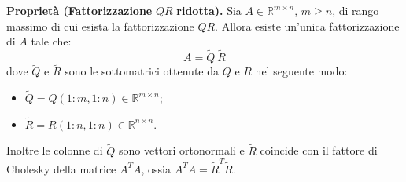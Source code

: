 \textbf{Proprietà (Fattorizzazione }$QR$\textbf{ ridotta).}  Sia $A\in \mathbb{R}^{m\times n}$, $m\geqslant n$, di rango massimo di cui esista la fattorizzazione $QR$. Allora esiste un'unica fattorizzazione di $A$ tale che:
\begin{equation*}
A=\tilde{Q} \ \tilde{R}
\end{equation*}
dove $\tilde{Q}$ e $\tilde{R}$ sono le sottomatrici ottenute da $Q$ e $R$ nel seguente modo:
\begin{itemize}
\item $\tilde{Q} =Q( 1:m,1:n) \in \mathbb{R}^{m\times n}$;
\item $\tilde{R} =R( 1:n,1:n) \in \mathbb{R}^{n\times n}$.
\end{itemize}

Inoltre le colonne di $\tilde{Q}$ sono vettori ortonormali e $\tilde{R}$ coincide con il fattore di Cholesky della matrice $A^{T} A$, ossia $A^{T} A=\tilde{R}^{T}\tilde{R}$.
